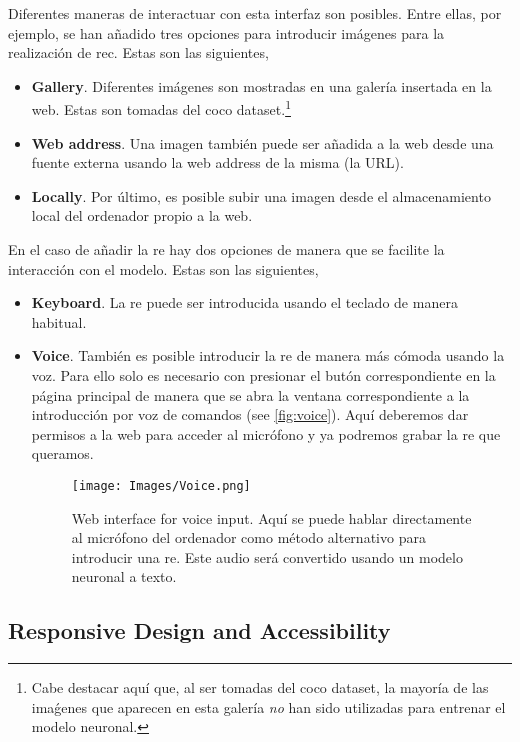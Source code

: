 Diferentes maneras de interactuar con esta interfaz son posibles. Entre ellas,
por ejemplo, se han añadido tres opciones para introducir imágenes para la
realización de \gls{rec}. Estas son las siguientes,
\begin{itemize}
  \item \textbf{Gallery}. Diferentes imágenes son mostradas en una galería
  insertada en la web. Estas son tomadas del \gls{coco} dataset.\footnote{Cabe
    destacar aquí que, al ser tomadas del \gls{coco} dataset, la mayoría de las
    imaǵenes que aparecen en esta galería \emph{no} han sido utilizadas para
    entrenar el modelo neuronal.}
  \item \textbf{Web address}. Una imagen también puede ser añadida a la web
  desde una fuente externa usando la web address de la misma (la URL).
  \item \textbf{Locally}. Por último, es posible subir una imagen desde el
  almacenamiento local del ordenador propio a la web.
\end{itemize}

En el caso de añadir la \gls{re} hay dos opciones de manera que se facilite la
interacción con el modelo. Estas son las siguientes,
\begin{itemize}
  \item \textbf{Keyboard}. La \gls{re} puede ser introducida usando el teclado
  de manera habitual.
  \item \textbf{Voice}. También es posible introducir la \gls{re} de manera más
  cómoda usando la voz. Para ello solo es necesario con presionar el butón
  correspondiente en la página principal de manera que se abra la ventana
  correspondiente a la introducción por voz de comandos (see
  \vref{fig:voice}). Aquí deberemos dar permisos a la web para acceder al
  micrófono y ya podremos grabar la \gls{re} que queramos.
  \begin{figure}[ht]
    \centering
    \texttt{[image: Images/Voice.png]}
    \caption[Web interface for voice input]{Web interface for voice input. Aquí
      se puede hablar directamente al micrófono del ordenador como método
      alternativo para introducir una \gls{re}. Este audio será convertido
      usando un modelo neuronal a texto.}\label{fig:voice}
  \end{figure}
\end{itemize}

\subsection{Responsive Design and Accessibility}%

